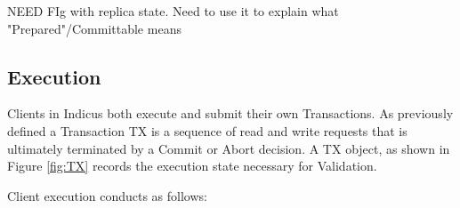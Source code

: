 NEED FIg with replica state. Need to use it to explain what "Prepared"/Committable means
\subsection{Execution}
Clients in Indicus both execute and submit their own Transactions. As previously defined a Transaction TX is a sequence of read and write requests that is ultimately terminated by a Commit or Abort decision. A TX object, as shown in Figure \ref{fig:TX} records the execution state necessary for Validation.

Client execution conducts as follows:\\

